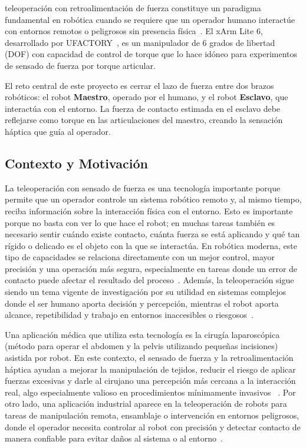 \documentclass[journal,10pt,twoside]{IEEEtran}
\begin{document}
 teleoperación con retroalimentación de fuerza
constituye un paradigma fundamental en robótica cuando se requiere que
un operador humano interactúe con entornos remotos o peligrosos sin
presencia física~\cite{murray1994}. El xArm Lite 6, desarrollado por
UFACTORY~\cite{xarm_github}, es un manipulador de 6 grados de libertad
(DOF) con capacidad de control de torque que lo hace idóneo para experimentos
de sensado de fuerza por torque articular.

\begin{theorybox}[Motivación]
  El reto central de este proyecto es cerrar el lazo de fuerza entre
  dos brazos robóticos: el robot \textbf{Maestro}, operado por el humano,
  y el robot \textbf{Esclavo}, que interactúa con el entorno.
  La fuerza de contacto estimada en el esclavo debe reflejarse como
  torque en las articulaciones del maestro, creando la sensación
  háptica que guía al operador.
\end{theorybox}

\subsection{Contexto y Motivación}

La teleoperación con sensado de fuerza es una tecnología importante porque permite que un operador controle un sistema robótico remoto y, al mismo tiempo, reciba información sobre la interacción física con el entorno. Esto es importante porque no basta con ver lo que hace el robot; en muchas tareas también es necesario sentir cuándo existe contacto, cuánta fuerza se está aplicando y qué tan rígido o delicado es el objeto con la que se interactúa. En robótica moderna, este tipo de capacidades se relaciona directamente con un mejor control, mayor precisión y una operación más segura, especialmente en tareas donde un error de contacto puede afectar el resultado del proceso~\cite{mueller2019}. Además, la teleoperación sigue siendo un tema vigente de investigación por su utilidad en sistemas complejos donde el ser humano aporta decisión y percepción, mientras el robot aporta alcance, repetibilidad y trabajo en entornos inaccesibles o riesgosos~\cite{darvish2023}.

Una aplicación médica que utiliza esta tecnología es la cirugía laparoscópica (método para operar el abdomen y la pelvis utilizando pequeñas incisiones) asistida por robot. En este contexto, el sensado de fuerza y la retroalimentación háptica ayudan a mejorar la manipulación de tejidos, reducir el riesgo de aplicar fuerzas excesivas y darle al cirujano una percepción más cercana a la interacción real, algo especialmente valioso en procedimientos mínimamente invasivos ~\cite{hao2024}. Por otro lado, una aplicación industrial aparece en la teleoperación de robots para tareas de manipulación remota, ensamblaje o intervención en entornos peligrosos, donde el operador necesita controlar al robot con precisión y detectar contacto de manera confiable para evitar daños al sistema o al entorno~\cite{darvish2023}.
\end{document}
